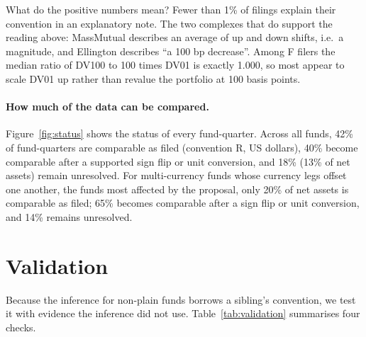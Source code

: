 \documentclass[11pt]{article}
\begin{document}
What do the positive numbers mean? Fewer than 1\% of filings explain their convention in an
explanatory note. The two complexes that do support the reading above: MassMutual describes an average
of up and down shifts, i.e.\ a magnitude, and Ellington describes ``a 100 bp decrease''. Among F
filers the median ratio of DV100 to 100 times DV01 is exactly 1.000, so most appear to scale DV01 up
rather than revalue the portfolio at 100 basis points.

\paragraph{How much of the data can be compared.} Figure~\ref{fig:status} shows the status of every
fund-quarter. Across all funds, 42\% of fund-quarters are comparable as filed (convention R, US
dollars), 40\% become comparable after a supported sign flip or unit conversion, and 18\% (13\% of
net assets) remain unresolved. For multi-currency funds whose currency legs offset one another, the
funds most affected by the proposal, only 20\% of net assets is comparable as filed; 65\% becomes comparable after a sign flip or unit conversion, and 14\% remains unresolved.


\section{Validation}\label{sec:validation}

Because the inference for non-plain funds borrows a sibling's convention, we test it with evidence the
inference did not use. Table~\ref{tab:validation} summarises four checks.
\end{document}
